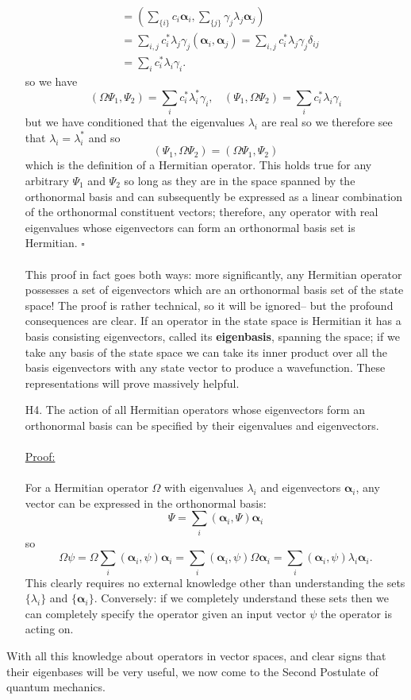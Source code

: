 \begin{enumerate}
$$\begin{aligned}
    &= \left(\sum_{\{i\}}c_{i}\bm{\alpha}_{i},\sum_{\{j\}}\gamma_{j}\lambda_{j}\bm{\alpha}_{j}\right)\\
    &=\sum_{i,j}c_{i}^{\ast}\lambda_{j}\gamma_{j}(\bm{\alpha}_{i},\bm{\alpha}_{j})=\sum_{i,j}c_{i}^{\ast}\lambda_{j}\gamma_{j}\delta_{ij}\\
    &=\sum_{i}c_{i}^{\ast}\lambda_{i}\gamma_{i}.
    \end{aligned}
    $$
    so we have 
    $$
    (\Omega\Psi_{1},\Psi_{2})=\sum_{i}c^{\ast}_{i}\lambda^{\ast}_{i}\gamma_{i},\:\:\:\:(\Psi_{1},\Omega\Psi_{2})=\sum_{i}c_{i}^{\ast}\lambda_{i}\gamma_{i}
    $$
    but we have conditioned that the eigenvalues $\lambda_{i}$ are real so we therefore see that $\lambda_{i}=\lambda_{i}^{\ast}$ and so
    $$
    (\Psi_{1},\Omega\Psi_{2})=(\Omega\Psi_{1},\Psi_{2})
    $$
    which is the definition of a Hermitian operator. This holds true for any arbitrary $\Psi_{1}$ and $\Psi_{2}$ so long as they are in the space spanned by the orthonormal basis and can subsequently be expressed as a linear combination of the orthonormal constituent vectors; therefore, any operator with real eigenvalues whose eigenvectors can form an orthonormal basis set is Hermitian. $\square$
    \\\\
    This proof in fact goes both ways: more significantly, any Hermitian operator possesses a set of eigenvectors which are an orthonormal basis set of the state space! The proof is rather technical,
    so it will be ignored-- but the profound consequences are clear. If an operator in the state space is Hermitian it has a basis consisting eigenvectors, called its \textbf{eigenbasis}, spanning the space; if we take any basis of the state space we can take its inner product over all the basis eigenvectors with any state vector to produce a wavefunction. These representations will prove massively helpful.
    \item[H4.] The action of all Hermitian operators whose eigenvectors form an orthonormal basis can be specified by their eigenvalues and eigenvectors.\\\\
    \underline{Proof:}\\\\
    For a Hermitian operator $\Omega$ with eigenvalues $\lambda_{i}$ and eigenvectors $\bm{\alpha}_{i}$, any vector can be expressed in the orthonormal basis:
    $$
    \Psi=\sum_{i}(\bm{\alpha}_{i},\Psi)\bm{\alpha}_{i}
    $$
    so 
    $$
    \Omega\psi=\Omega\sum_{i}(\bm{\alpha}_{i},\psi)\bm{\alpha}_{i}=\sum_{i}(\bm{\alpha}_{i},\psi)\Omega\bm{\alpha}_{i}=\sum_{i}(\bm{\alpha}_{i},\psi)\lambda_{i}\bm{\alpha}_{i}.
    $$
    This clearly requires no external knowledge other than understanding the sets $\{\lambda_{i}\}$ and $\{\bm{\alpha}_{i}\}$. Conversely: if we completely understand these sets then we can completely specify the operator given an input vector $\psi$ the operator is acting on. 
\end{enumerate}
With all this knowledge about operators in vector spaces, and clear signs that their eigenbases will be very useful, we now come to the Second Postulate of quantum mechanics.

